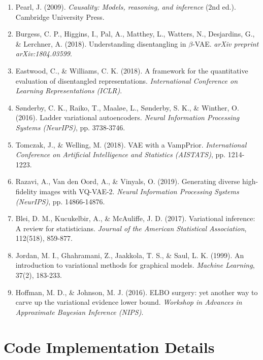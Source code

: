 \documentclass[conference]{IEEEtran}
\begin{document}
\begin{enumerate}
    \item Pearl, J. (2009). \textit{Causality: Models, reasoning, and inference} (2nd ed.). Cambridge University Press.
    
    \item Burgess, C. P., Higgins, I., Pal, A., Matthey, L., Watters, N., Desjardins, G., \& Lerchner, A. (2018). Understanding disentangling in $\beta$-VAE. \textit{arXiv preprint arXiv:1804.03599}.
    
    \item Eastwood, C., \& Williams, C. K. (2018). A framework for the quantitative evaluation of disentangled representations. \textit{International Conference on Learning Representations (ICLR)}.
    
    \item Sønderby, C. K., Raiko, T., Maaløe, L., Sønderby, S. K., \& Winther, O. (2016). Ladder variational autoencoders. \textit{Neural Information Processing Systems (NeurIPS)}, pp. 3738-3746.
    
    \item Tomczak, J., \& Welling, M. (2018). VAE with a VampPrior. \textit{International Conference on Artificial Intelligence and Statistics (AISTATS)}, pp. 1214-1223.
    
    \item Razavi, A., Van den Oord, A., \& Vinyals, O. (2019). Generating diverse high-fidelity images with VQ-VAE-2. \textit{Neural Information Processing Systems (NeurIPS)}, pp. 14866-14876.
    
    \item Blei, D. M., Kucukelbir, A., \& McAuliffe, J. D. (2017). Variational inference: A review for statisticians. \textit{Journal of the American Statistical Association}, 112(518), 859-877.
    
    \item Jordan, M. I., Ghahramani, Z., Jaakkola, T. S., \& Saul, L. K. (1999). An introduction to variational methods for graphical models. \textit{Machine Learning}, 37(2), 183-233.
    
    \item Hoffman, M. D., \& Johnson, M. J. (2016). ELBO surgery: yet another way to carve up the variational evidence lower bound. \textit{Workshop in Advances in Approximate Bayesian Inference (NIPS)}.
\end{enumerate}

\appendix

\section{Code Implementation Details}
\end{document}
